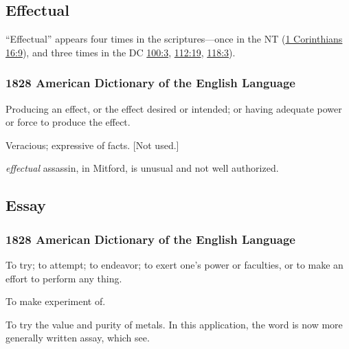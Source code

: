 	\subsection{Effectual} %
		\label{EFFECTUAL}
		
		``Effectual'' appears four times in the scriptures---once in the NT (\hyperref[1CORINTHIANS-16-9]{1 Corinthians 16:9}), and three times in the DC \hyperref[DC100-3]{100:3}, \hyperref[DC112-19]{112:19}, \hyperref[DC118-3]{118:3}).
		
		\subsubsection{1828 American Dictionary of the English Language}
		
			\begin{compactitem}
				\item Producing an effect, or the effect desired or intended; or having adequate power or force to produce the effect.
				\item[1] Veracious; expressive of facts. [Not used.]
				\item[2] \textit{effectual} assassin, in Mitford, is unusual and not well authorized.
			\end{compactitem}
			
	\subsection{Essay} %
		\label{ESSAY}
		
		\subsubsection{1828 American Dictionary of the English Language}
		
			\begin{compactitem}
				\item[1] To try; to attempt; to endeavor; to exert one's power or faculties, or to make an effort to perform any thing.
				\item[2] To make experiment of.
				\item[3] To try the value and purity of metals. In this application, the word is now more generally written assay, which see.
			\end{compactitem}

